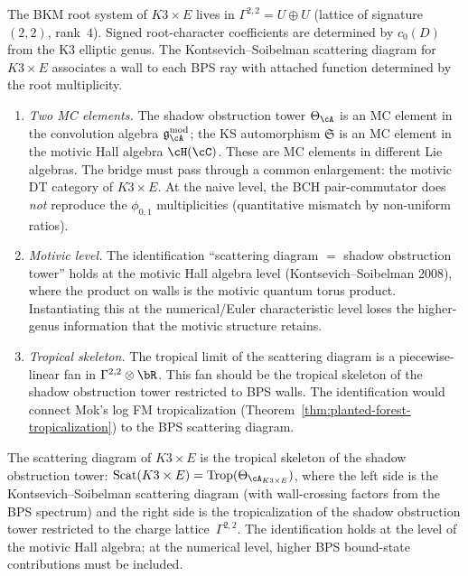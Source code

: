 \begin{openproblem}
\label{op:programme-g-bkm-scattering}
The BKM root system of
$K3 \times E$ lives in $\Gamma^{2,2} = U \oplus U$
(lattice of signature $(2,2)$, rank~$4$).
Signed root-character coefficients are determined by $c_0(D)$ from the K3
elliptic genus. The Kontsevich--Soibelman scattering
diagram for $K3 \times E$ associates a wall to each BPS ray
with attached function determined by the root multiplicity.
\begin{enumerate}[label=\textup{(\roman*)}]
\item \emph{Two MC elements.} The shadow obstruction tower
 $\Theta_{\cA}$ is an MC element in the convolution
 algebra $\mathfrak{g}_\cA^{\mathrm{mod}}$; the KS
 automorphism $\mathfrak{S}$ is an MC element in the
 motivic Hall algebra $\cH(\cC)$. These are MC elements
 in different Lie algebras. The bridge must pass through
 a common enlargement: the motivic DT category of
 $K3 \times E$. At the naive level, the BCH
 pair-commutator does \emph{not} reproduce the
 $\phi_{0,1}$ multiplicities (quantitative
 mismatch by non-uniform ratios).
\item \emph{Motivic level.} The identification
 ``scattering diagram $=$ shadow obstruction tower'' holds at
 the motivic Hall algebra level (Kontsevich--Soibelman 2008),
 where the product on walls is the motivic
 quantum torus product. Instantiating this at the
 numerical/Euler characteristic level loses the
 higher-genus information that the motivic structure
 retains.
\item \emph{Tropical skeleton.} The tropical limit of
 the scattering diagram is a piecewise-linear fan in
 $\Gamma^{2,2} \otimes \bR$. This fan should be the
 tropical skeleton of the shadow obstruction tower
 restricted to BPS walls. The identification would
 connect Mok's log FM tropicalization
 (Theorem~\ref{thm:planted-forest-tropicalization})
 to the BPS scattering diagram.
\end{enumerate}
\end{openproblem}

\begin{conjecture}
\label{conj:scattering-tropical-shadow}
\ClaimStatusConjectured
{}
The scattering diagram of $K3 \times E$ is the tropical
skeleton of the shadow obstruction tower:
$\operatorname{Scat}(K3 \times E)
= \operatorname{Trop}(\Theta_{\cA_{K3 \times E}})$,
where the left side is the Kontsevich--Soibelman
scattering diagram \textup{(}with wall-crossing factors
from the BPS spectrum\textup{)} and the right side is the
tropicalization of the shadow obstruction tower restricted
to the charge lattice~$\Gamma^{2,2}$.
The identification holds at the level of the motivic Hall
algebra; at the numerical level, higher BPS bound-state
contributions must be included.
\end{conjecture}

